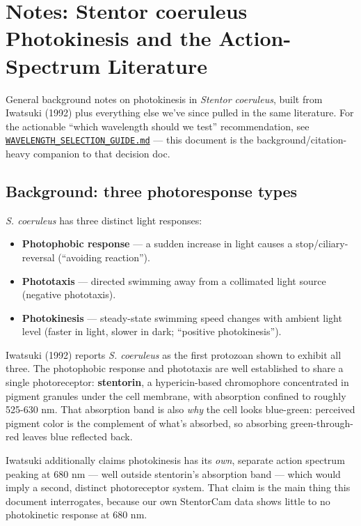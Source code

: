 \documentclass[
]{article}
\author{}
\date{}
\providecommand{\tightlist}{%
  \setlength{\itemsep}{0pt}\setlength{\parskip}{0pt}}
\begin{document}
\hypertarget{notes-stentor-coeruleus-photokinesis-and-the-action-spectrum-literature}{%
\section{Notes: Stentor coeruleus Photokinesis and the Action-Spectrum
Literature}\label{notes-stentor-coeruleus-photokinesis-and-the-action-spectrum-literature}}

General background notes on photokinesis in \emph{Stentor coeruleus},
built from Iwatsuki (1992) plus everything else we've since pulled in
the same literature. For the actionable ``which wavelength should we
test'' recommendation, see
\href{WAVELENGTH_SELECTION_GUIDE.md}{\texttt{WAVELENGTH\_SELECTION\_GUIDE.md}}
--- this document is the background/citation-heavy companion to that
decision doc.

\hypertarget{background-three-photoresponse-types}{%
\subsection{Background: three photoresponse
types}\label{background-three-photoresponse-types}}

\emph{S. coeruleus} has three distinct light responses:

\begin{itemize}
\tightlist
\item
  \textbf{Photophobic response} --- a sudden increase in light causes a
  stop/ciliary-reversal (``avoiding reaction'').
\item
  \textbf{Phototaxis} --- directed swimming away from a collimated light
  source (negative phototaxis).
\item
  \textbf{Photokinesis} --- steady-state swimming speed changes with
  ambient light level (faster in light, slower in dark; ``positive
  photokinesis'').
\end{itemize}

Iwatsuki (1992) reports \emph{S. coeruleus} as the first protozoan shown
to exhibit all three. The photophobic response and phototaxis are well
established to share a single photoreceptor: \textbf{stentorin}, a
hypericin-based chromophore concentrated in pigment granules under the
cell membrane, with absorption confined to roughly 525-630 nm. That
absorption band is also \emph{why} the cell looks blue-green: perceived
pigment color is the complement of what's absorbed, so absorbing
green-through-red leaves blue reflected back.

Iwatsuki additionally claims photokinesis has its \emph{own}, separate
action spectrum peaking at 680 nm --- well outside stentorin's
absorption band --- which would imply a second, distinct photoreceptor
system. That claim is the main thing this document interrogates, because
our own StentorCam data shows little to no photokinetic response at 680
nm.
\end{document}
